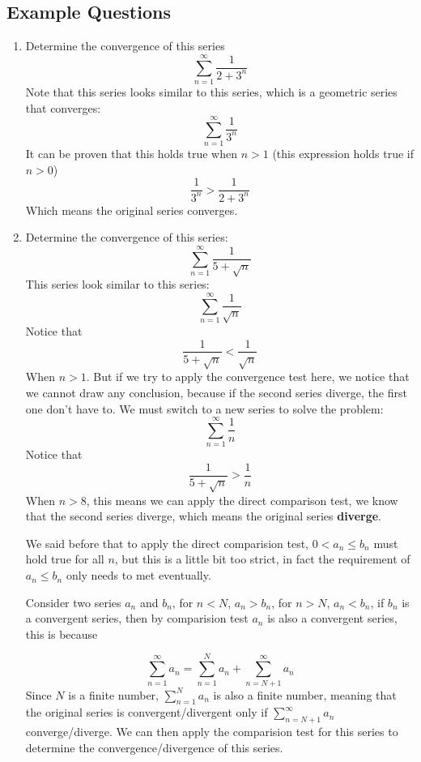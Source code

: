 \documentclass{article}
\numberwithin{equation}{section}
\begin{document}
\subsection{Example Questions}
\begin{enumerate}
    \item Determine the convergence of this series
    \[
        \sum_{n = 1}^{\infty} \frac{1}{2 + 3^n}
    \]
    Note that this series looks similar to this series, which is a geometric series that converges:
    \[
        \sum_{n = 1}^{\infty} \frac{1}{3^n}
    \]
    It can be proven that this holds true when $n>1$ (this expression holds true if $n>0$)
    \[
        \frac{1}{3^n} > \frac{1}{2 + 3^n}
    \]
    Which means the original series converges.

    \newpage
    \item Determine the convergence of this series:
    \[
        \sum_{n = 1}^{\infty} \frac{1}{5 + \sqrt{n}}
    \]
    This series look similar to this series:
    \[
        \sum_{n = 1}^{\infty} \frac{1}{\sqrt{n}} 
    \]
    Notice that 
    \[
        \frac{1}{5 + \sqrt{n}} < \frac{1}{\sqrt{n}}
    \]
    When $n > 1$. But if we try to apply the convergence test here, we notice that we cannot draw any conclusion,
    because if the second series diverge, the first one don't have to. We must switch to a new series to solve the problem:
    \[
        \sum_{n = 1}^{\infty}\frac{1}{n}
    \]
    Notice that 
    \[
        \frac{1}{5 + \sqrt{n}} > \frac{1}{n}
    \]
    When $n > 8$, this means we can apply the direct comparison test, we know that the second series diverge, 
    which means the original series \textbf{diverge}.

    We said before that to apply the direct comparision test, $0<a_n\leq b_n$ must hold true for all $n$, but this is a little bit too strict, in fact the requirement of $a_n \leq b_n$ only needs to met eventually.

    Consider two series $a_n$ and $b_n$, for $n < N$, $a_n > b_n$, for $n > N$, $a_n < b_n$, if $b_n$ is a convergent series, then by comparision test $a_n$ is also a convergent series, this is because

    \[
    \sum_{n=1}^{\infty} a_n = \sum_{n=1}^{N} a_n + \sum_{n=N+1}^{\infty} a_n
    \]
    Since $N$ is a finite number, $\displaystyle \sum_{n=1}^{N} a_n$ is also a finite number, meaning that the original series is convergent/divergent only if $\displaystyle \sum_{n=N+1}^{\infty} a_n$ converge/diverge. We can then apply the comparision test for this series to determine the convergence/divergence of this series.
\end{enumerate}
\end{document}
